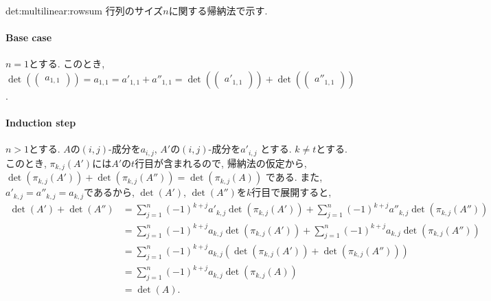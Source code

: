 \begin{proofof*}{det:multilinear:row}{sum}
  行列のサイズ$n$に関する帰納法で示す.
  \paragraph{Base case}
  $n=1$とする.
  このとき,
  $\det(\begin{pmatrix}a_{1,1}\end{pmatrix})=a_{1,1}=a'_{1,1}+a''_{1,1}=\det(\begin{pmatrix}a'_{1,1}\end{pmatrix})+\det(\begin{pmatrix}a''_{1,1}\end{pmatrix})$.
  \paragraph{Induction step}
  $n>1$とする.
  $A$の$(i,j)$-成分を$a_{i,j}$,
  $A'$の$(i,j)$-成分を$a'_{i,j}$
  とする.
  $k\neq t$とする.
  このとき,
  $\pi_{k,j}(A')$には$A'$の$t$行目が含まれるので,
  帰納法の仮定から,
  $\det(\pi_{k,j}(A'))+\det(\pi_{k,j}(A''))=\det(\pi_{k,j}(A))$
  である.
  また, $a'_{k,j}=a''_{k,j}=a_{k,j}$であるから,
  $\det(A')$, $\det(A'')$を$k$行目で展開すると,
  \begin{align*}
    \det(A')+\det(A'')
    &=\sum_{j=1}^{n} (-1)^{k+j} a'_{k,j}\det(\pi_{k,j}(A'))
    +\sum_{j=1}^{n} (-1)^{k+j} a''_{k,j}\det(\pi_{k,j}(A''))\\
    &=\sum_{j=1}^{n} (-1)^{k+j} a_{k,j}\det(\pi_{k,j}(A'))
    +\sum_{j=1}^{n} (-1)^{k+j} a_{k,j}\det(\pi_{k,j}(A''))\\
    &=\sum_{j=1}^{n} (-1)^{k+j} a_{k,j}(\det(\pi_{k,j}(A'))+\det(\pi_{k,j}(A'')))\\
    &=\sum_{j=1}^{n} (-1)^{k+j} a_{k,j}\det(\pi_{k,j}(A))\\
    &=\det(A).
  \end{align*}
\end{proofof*}


